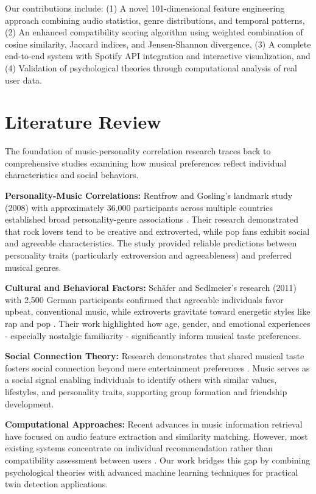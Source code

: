 \documentclass[conference]{IEEEtran}
\begin{document}
Our contributions include: (1) A novel 101-dimensional feature engineering approach combining audio statistics, genre distributions, and temporal patterns, (2) An enhanced compatibility scoring algorithm using weighted combination of cosine similarity, Jaccard indices, and Jensen-Shannon divergence, (3) A complete end-to-end system with Spotify API integration and interactive visualization, and (4) Validation of psychological theories through computational analysis of real user data.

\section{Literature Review}

The foundation of music-personality correlation research traces back to comprehensive studies examining how musical preferences reflect individual characteristics and social behaviors.

\textbf{Personality-Music Correlations:} Rentfrow and Gosling's landmark study (2008) with approximately 36,000 participants across multiple countries established broad personality-genre associations \cite{rentfrow2008music}. Their research demonstrated that rock lovers tend to be creative and extroverted, while pop fans exhibit social and agreeable characteristics. The study provided reliable predictions between personality traits (particularly extroversion and agreeableness) and preferred musical genres.

\textbf{Cultural and Behavioral Factors:} Schäfer and Sedlmeier's research (2011) with 2,500 German participants confirmed that agreeable individuals favor upbeat, conventional music, while extroverts gravitate toward energetic styles like rap and pop \cite{schafer2011music}. Their work highlighted how age, gender, and emotional experiences - especially nostalgic familiarity - significantly inform musical taste preferences.

\textbf{Social Connection Theory:} Research demonstrates that shared musical taste fosters social connection beyond mere entertainment preferences \cite{miranda2009music}. Music serves as a social signal enabling individuals to identify others with similar values, lifestyles, and personality traits, supporting group formation and friendship development.

\textbf{Computational Approaches:} Recent advances in music information retrieval have focused on audio feature extraction and similarity matching. However, most existing systems concentrate on individual recommendation rather than compatibility assessment between users \cite{lamere2008social}. Our work bridges this gap by combining psychological theories with advanced machine learning techniques for practical twin detection applications.
\end{document}
